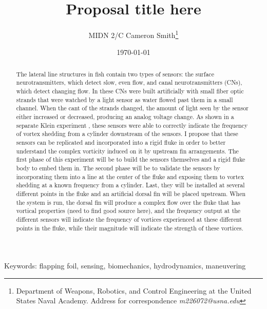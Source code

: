 \documentclass[10pt]{article}
\title{Proposal title here}
\author{MIDN 2/C Cameron Smith\thanks{Department of Weapons, Robotics, and Control Engineering at the United States Naval Academy. Address for correspondence \emph{m226072@usna.edu}}}
\date{\today}
\begin{document}
\maketitle

\begin{abstract}
The lateral line structures in fish contain two types of sensors: the surface neurotransmitters, which detect slow, even flow, and canal neurotransmitters (CNs), which detect changing
flow. In \citep{klein2011title} these CNs were built artificially with small fiber optic strands that were watched by a light sensor as water flowed past them in a small channel. When the cant of the strands changed, the amount of light seen by the sensor either increased or decreased, producing an analog voltage change. As shown in a separate Klein experiment \citep{klein2011title}, these sensors were able to correctly indicate the frequency of vortex shedding from a cylinder downstream of the sensors. I propose that these sensors can be replicated and incorporated into a rigid fluke in order to
better understand the complex vorticity induced on it by upstream fin arrangements. The first phase of this experiment will be to build the sensors themselves and a rigid fluke body to embed them in. The second phase will be to validate the sensors by incorporating them into a line at the center of the fluke and exposing them to vortex shedding at a known frequency from a cylinder. Last, they will be installed at several different points in the fluke and an artificial dorsal fin will be placed upstream. When the system is run, the dorsal fin will produce a complex flow over the fluke that has vortical properties (need to find good source here), and the frequency output at the different sensors will indicate the frequency of vortices experienced at these different points in the fluke, while their magnitude will indicate the strength of these vortices.
\end{abstract}


{\scriptsize Keywords: flapping foil, sensing, biomechanics, hydrodynamics, maneuvering}


\end{document}
